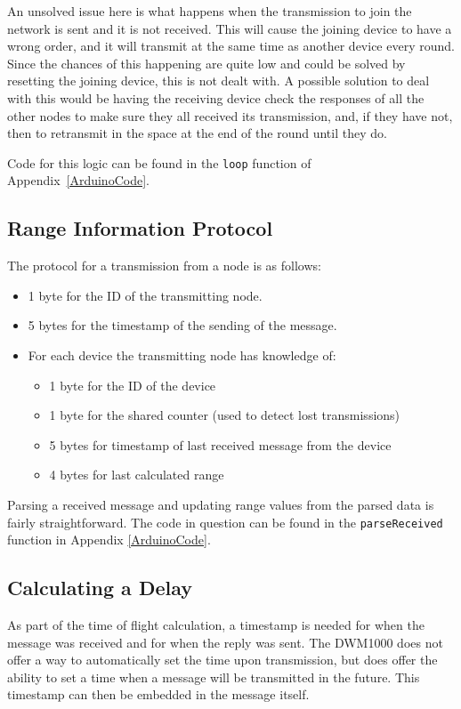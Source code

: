 An unsolved issue here is what happens when the transmission to join the network is sent and it is not received. This will cause the joining device to have a wrong order, and it will transmit at the same time as another device every round. Since the chances of this happening are quite low and could be solved by resetting the joining device, this is not dealt with. A possible solution to deal with this would be having the receiving device check the responses of all the other nodes to make sure they all received its transmission, and, if they have not, then to retransmit in the space at the end of the round until they do.

Code for this logic can be found in the \texttt{loop} function of Appendix~\ref{ArduinoCode}.

\subsection{Range Information Protocol}
The protocol for a transmission from a node is as follows:

\begin{itemize}
	\item 1 byte for the ID of the transmitting node.
	\item 5 bytes for the timestamp of the sending of the message.
	\item For each device the transmitting node has knowledge of:
	\begin{itemize}
		\item 1 byte for the ID of the device
		\item 1 byte for the shared counter (used to detect lost transmissions)
		\item 5 bytes for timestamp of last received message from the device
		\item 4 bytes for last calculated range	
	\end{itemize} 
\end{itemize}

Parsing a received message and updating range values from the parsed data is fairly straightforward. The code in question can be found in the \texttt{parseReceived} function in Appendix \ref{ArduinoCode}.

\subsection{Calculating a Delay}
\label{CalculatingADelay}
As part of the time of flight calculation, a timestamp is needed for when the message was received and for when the reply was sent. The DWM1000 does not offer a way to automatically set the time upon transmission, but does offer the ability to set a time when a message will be transmitted in the future. This timestamp can then be embedded in the message itself.

